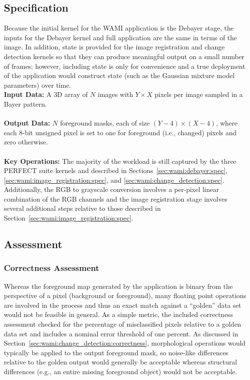 \documentclass{report}
\begin{document}
\subsection{Specification}

Because the initial kernel for the WAMI application is the Debayer stage,
the inputs for the Debayer kernel and full application are the same in
terms of the image.
In addition, state is provided for the image registration and change
detection kernels so that they can produce meaningful output on a small
number of frames; however, including state is only for convenience and
a true deployment of the application would construct state (such as the
Gaussian mixture model parameters) over time. \\

\noindent \textbf{Input Data:} A {3D} array of $N$ images with
$Y \times X$ pixels per image sampled in a Bayer pattern. \\ \\
\textbf{Output Data:} 
$N$ foreground masks, each of size $(Y-4) \times (X-4)$, where each 8-bit unsigned pixel
is set to one for foreground (i.e., changed) pixels and zero otherwise. \\ \\
\textbf{Key Operations:} The majority of the workload is still captured by
the three PERFECT suite kernels and described in Sections~\ref{sec:wami:debayer:spec},
\ref{sec:wami:image_registration:spec}, and \ref{sec:wami:change_detection:spec}.
Additionally, the RGB to grayscale conversion involves a per-pixel linear
combination of the RGB channels and the image registration stage involves
several additional steps relative to those described in Section~\ref{sec:wami:image_registration:spec}.

\subsection{Assessment}

\subsubsection{Correctness Assessment}

Whereas the foreground map generated by the application is binary from the perspective of a pixel
(background or foreground), many floating point operations are involved in the process
and thus an exact match against a ``golden'' data set would not be feasible
in general.
As a simple metric, the included correctness assessment checked for the percentage
of misclassified pixels relative to a golden data set and includes a nominal
error threshold of one percent.
As discussed in Section~\ref{sec:wami:change_detection:correctness}, morphological
operations would typically be applied to the output foreground mask, so noise-like
differences relative to the golden output would generally be acceptable whereas
structural differences (e.g., an entire missing foreground object) would not
be acceptable.
\end{document}
